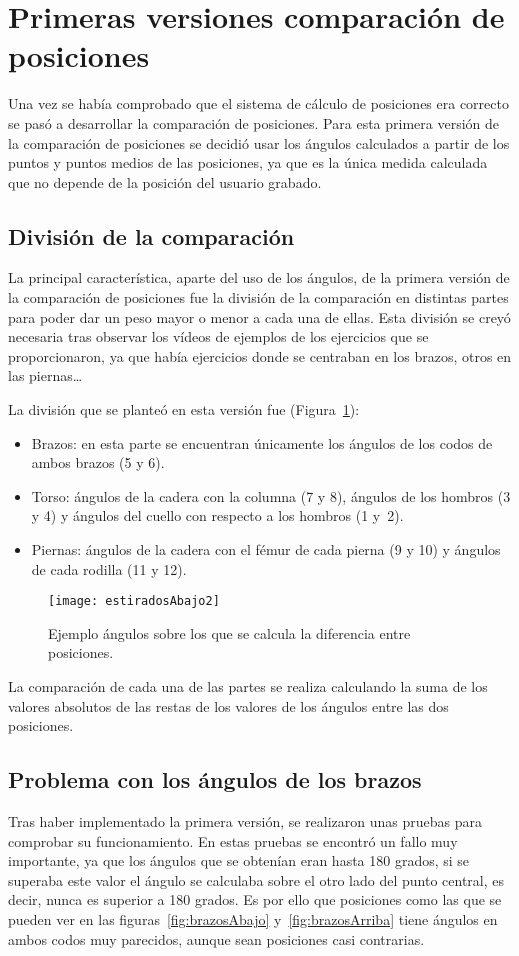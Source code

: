 {\section{Primeras versiones comparación de posiciones} \label{PrimeraVersion}
Una vez se había comprobado que el sistema de cálculo de posiciones era correcto se pasó a desarrollar la comparación de posiciones. Para esta primera versión de la comparación de posiciones se decidió usar los ángulos calculados a partir de los puntos y puntos medios de las posiciones, ya que es la única medida calculada que no depende de la posición del usuario grabado.
\subsection{División de la comparación}
La principal característica, aparte del uso de los ángulos, de la primera versión de la comparación de posiciones fue la división de la comparación en distintas partes para poder dar un peso mayor o menor a cada una de ellas. Esta división se creyó necesaria tras observar los vídeos de ejemplos de los ejercicios que se proporcionaron, ya que había ejercicios donde se centraban en los brazos, otros en las piernas\ldots

La división que se planteó en esta versión fue (Figura~\ref{fig:estiradosAbajo2}):
\begin{itemize}
	\item Brazos: en esta parte se encuentran únicamente los ángulos de los codos de ambos brazos (5 y 6).
	\item Torso: ángulos de la cadera con la columna (7 y 8), ángulos de los hombros (3 y 4) y ángulos del cuello con respecto a los hombros (1 y~2).
	\item Piernas: ángulos de la cadera con el fémur de cada pierna (9 y 10) y ángulos de cada rodilla (11 y 12).
\end{itemize}

\begin{figure}[h]
	\centering
	\texttt{[image: estiradosAbajo2]}
	\caption{Ejemplo ángulos sobre los que se calcula la diferencia entre posiciones.}
	\label{fig:estiradosAbajo2}
\end{figure}

La comparación de cada una de las partes se realiza calculando la suma de los valores absolutos de las restas de los valores de los ángulos entre las dos posiciones.

\subsection{Problema con los ángulos de los brazos}
Tras haber implementado la primera versión, se realizaron unas pruebas para comprobar su funcionamiento. En estas pruebas se encontró un fallo muy importante, ya que los ángulos que se obtenían eran hasta 180 grados, si se superaba este valor el ángulo se calculaba sobre el otro lado del punto central, es decir, nunca es superior a 180 grados. Es por ello que  posiciones como las que se pueden ver en las figuras~\ref{fig:brazosAbajo} y~\ref{fig:brazosArriba} tiene ángulos en ambos codos muy parecidos, aunque sean posiciones casi contrarias.

}
